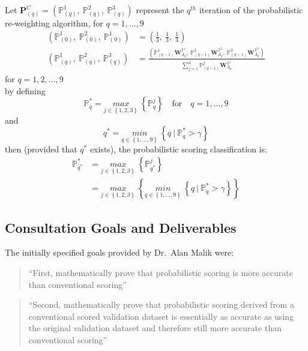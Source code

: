 \documentclass[12pt,]{article}
\begin{document}
Let
\(\mathbf{P}_{(q)}^{C}=\left(\mathbb{P}_{(q)}^{1}, \ \mathbb{P}_{(q)}^{2}, \ \mathbb{P}_{(q)}^{3} \right)\)
represent the \(q^{th}\) iteration of the probabilistic re-weighting
algorithm, for \(q=1, \ldots, 9\) \begin{align*}
\left(\mathbb{P}_{(0)}^{1}, \ \mathbb{P}_{(0)}^{2}, \ \mathbb{P}_{(0)}^{1} \right) &= \left( \frac{1}{3}, \  \frac{1}{3}, \ \frac{1}{3}\right) \\[0.5em]
    \left(\mathbb{P}_{(q)}^{1}, \ \mathbb{P}_{(q)}^{2}, \ \mathbb{P}_{(q)}^{3} \right) &= \frac{\left(\mathbb{P}_{(q-1)}^{1}\mathbf{W}_{A_{q}}^{\mathbb{T}^{1}}, \ \mathbb{P}_{(q-1)}^{2}\mathbf{W}_{A_{q}}^{\mathbb{T}^{2}}, \ \mathbb{P}_{(q-1)}^{3}\mathbf{W}_{A_{q}}^{\mathbb{T}^{3}} \right) }{\sum_{j=1}^{3} \mathbb{P}_{(q-1)}^{j}\mathbf{W}_{A_{q}}^{\mathbb{T}^{j}}} \tag{EQ: 1.3.2-2} \label{EQ: 1.3.2-2}
\end{align*} for \(q=1, 2, \ldots, 9\)\\
by defining
\[\mathbb{P}_{q}^{*}= \underset{j \in \left \{1, 2, 3 \right \}}{max} \ \left \{ \mathbb{P}_{q}^{j} \right \} \quad \text{for} \quad q=1, \ldots, 9\]
and
\[q^{*}=\underset{q \in \left \{1, \ldots, 9 \right \}}{min} \ \left \{q \ \Big | \ \mathbb{P}^{*}_{q} > \gamma \right \}\]
then (provided that \(q^{*}\) exists), the probabilistic scoring
classification is: \begin{align*}
\mathbb{P}_{q^{*}}^{*} &= \underset{j \in \left \{1, 2, 3 \right \}}{max} \ \left \{ \mathbb{P}_{q^{*}}^{j} \right \} \\[0.5em]
&= \underset{j \in \left \{1, 2, 3 \right \}}{max} \ \left \{ \underset{q \in \left \{1, \ldots, 9 \right \}}{min} \ \left \{q \ \Big | \ \mathbb{P}^{*}_{q} > \gamma \right \} \right \}
\end{align*}

\hypertarget{consultation-goals-and-deliverables}{%
\subsection{Consultation Goals and
Deliverables}\label{consultation-goals-and-deliverables}}

The initially specified goals provided by Dr.~Alan Malik were:

\begin{quote}
``First, mathematically prove that probabilistic scoring is more
accurate than conventional scoring''
\end{quote}

\begin{quote}
``Second, mathematically prove that probabilistic scoring derived from a
conventional scored validation dataset is essentially as accurate as
using the original validation dataset and therefore still more accurate
than conventional scoring''
\end{quote}
\end{document}
